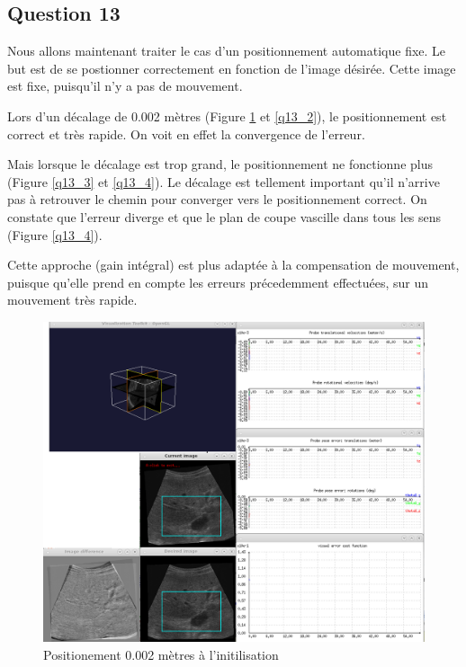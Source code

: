 \documentclass[a4paper,11pt]{article}
\begin{document}
\subsection{Question 13}

Nous allons maintenant traiter le cas d'un positionnement automatique fixe. Le but est de se postionner correctement en fonction de l'image d\'esir\'ee. Cette image est fixe, puisqu'il n'y a pas de mouvement.
\par
Lors d'un d\'ecalage de 0.002 m\`etres (Figure \ref{q13_1} et \ref{q13_2}), le positionnement est correct et tr\`es rapide. On voit en effet la convergence de l'erreur.
\par
Mais lorsque le d\'ecalage est trop grand, le positionnement ne fonctionne plus (Figure \ref{q13_3} et \ref{q13_4}). Le d\'ecalage est tellement important qu'il n'arrive pas \`a retrouver le chemin pour converger vers le positionnement correct. On constate que l'erreur diverge et que le plan de coupe vascille dans tous les sens (Figure \ref{q13_4}).
\par
Cette approche (gain int\'egral) est plus adapt\'ee \`a la compensation de mouvement, puisque qu'elle prend en compte les erreurs pr\'ecedemment effectu\'ees, sur un mouvement tr\`es rapide.
\begin{figure}[H]
    \centering
    \includegraphics[width=0.5\textheight]{./images/q13_0,002_begin.png}
    \caption{ Positionement 0.002 m\`etres \`a l'initilisation }
    \label{q13_1}
\end{figure}
\end{document}
